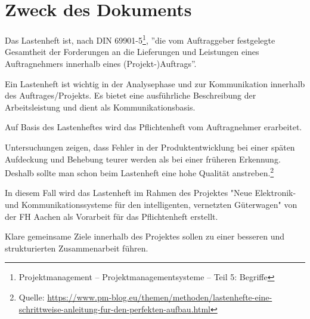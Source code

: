\section*{Zweck des Dokuments}
Das Lastenheft ist, nach \acrshort{DIN} 69901-5\footnote{Projektmanagement – Projektmanagementsysteme – Teil 5: Begriffe}, ''die vom Auftraggeber festgelegte Gesamtheit der Forderungen an die Lieferungen und Leistungen eines Auftragnehmers innerhalb eines (Projekt-)Auftrags''.\par
Ein Lastenheft ist wichtig in der Analysephase und zur Kommunikation innerhalb des Auftrages/Projekts. Es bietet eine ausführliche Beschreibung der Arbeitsleistung und dient als Kommunikationsbasis.\par
Auf Basis des Lastenheftes wird das Pflichtenheft vom Auftragnehmer erarbeitet.\par
Untersuchungen zeigen, dass Fehler in der Produktentwicklung bei einer späten Aufdeckung und Behebung teurer werden als bei einer früheren Erkennung. Deshalb sollte man schon beim Lastenheft eine hohe Qualität anstreben.\footnote{Quelle: \url{https://www.pm-blog.eu/themen/methoden/lastenhefte-eine-schrittweise-anleitung-fur-den-perfekten-aufbau.html} }\par
In diesem Fall wird das Lastenheft im Rahmen des Projektes "Neue Elektronik- und Kommunikationssysteme für den intelligenten, vernetzten Güterwagen" von der FH Aachen als Vorarbeit für das Pflichtenheft erstellt. \par
Klare gemeinsame Ziele innerhalb des Projektes sollen zu einer besseren und strukturierten Zusammenarbeit führen.
